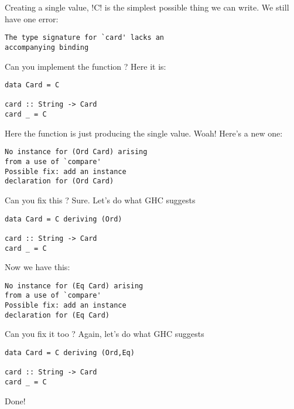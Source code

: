 Creating a single value, \il!C! is the simplest possible thing we can write.
\lhN \error We still have one error: 
\begin{verbatim}
The type signature for `card' lacks an 
accompanying binding
\end{verbatim}
Can you implement the function ?
\lhA \error Here it is:
\begin{lstlisting}[frame=single]
data Card = C 

card :: String -> Card
card _ = C
\end{lstlisting}
Here the function is just producing the single value.
\lhN \error Woah! Here's a new one:
\begin{verbatim}
No instance for (Ord Card) arising 
from a use of `compare' 
Possible fix: add an instance 
declaration for (Ord Card)
\end{verbatim}
Can you fix this ?
\lhA \error Sure. Let's do what GHC suggests
\begin{lstlisting}[frame=single]
data Card = C deriving (Ord)

card :: String -> Card
card _ = C
\end{lstlisting}
\lhN \error Now we have this:
\begin{verbatim}
No instance for (Eq Card) arising 
from a use of `compare' 
Possible fix: add an instance 
declaration for (Eq Card)
\end{verbatim}
Can you fix it too ?
\lhA \error Again, let's do what GHC suggests 
\begin{lstlisting}[frame=single]
data Card = C deriving (Ord,Eq)

card :: String -> Card
card _ = C
\end{lstlisting}
\success Done!
\lhend